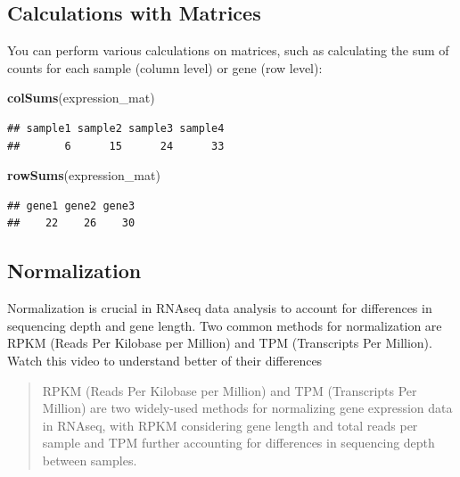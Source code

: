\documentclass[
]{book}
\newenvironment{Shaded}{\begin{snugshade}}{\end{snugshade}}
\newcommand{\FunctionTok}[1]{\textcolor[rgb]{0.13,0.29,0.53}{\textbf{#1}}}
\newcommand{\NormalTok}[1]{#1}
\begin{document}
\hypertarget{calculations-with-matrices}{%
\subsection{Calculations with Matrices}\label{calculations-with-matrices}}

You can perform various calculations on matrices, such as calculating the sum of counts for each sample (column level) or gene (row level):

\begin{Shaded}
\begin{Highlighting}[]
\FunctionTok{colSums}\NormalTok{(expression\_mat)}
\end{Highlighting}
\end{Shaded}

\begin{verbatim}
## sample1 sample2 sample3 sample4 
##       6      15      24      33
\end{verbatim}

\begin{Shaded}
\begin{Highlighting}[]
\FunctionTok{rowSums}\NormalTok{(expression\_mat)}
\end{Highlighting}
\end{Shaded}

\begin{verbatim}
## gene1 gene2 gene3 
##    22    26    30
\end{verbatim}

\hypertarget{normalization}{%
\subsection{Normalization}\label{normalization}}

Normalization is crucial in RNAseq data analysis to account for differences in sequencing depth and gene length. Two common methods for normalization are RPKM (Reads Per Kilobase per Million) and TPM (Transcripts Per Million). Watch this video to understand better of their differences

\begin{quote}
RPKM (Reads Per Kilobase per Million) and TPM (Transcripts Per Million) are two widely-used methods for normalizing gene expression data in RNAseq, with RPKM considering gene length and total reads per sample and TPM further accounting for differences in sequencing depth between samples.
\end{quote}
\end{document}
